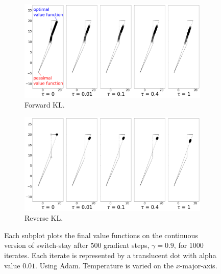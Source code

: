 \documentclass{article}
\begin{document}
\begin{figure}[ht]
  \centering
  \begin{subfigure}[b]{0.45\linewidth}
    \centering
    \includegraphics[width=\columnwidth]{figs/continuous-switch-stay/notlearnQ/cont_poly.png}
    \caption{Forward KL.}
    \label{fig:cont-switch-stay-forward}
  \end{subfigure}\hspace{15pt}%
  \begin{subfigure}[b]{0.45\linewidth}
        \centering
        \includegraphics[width=\columnwidth]{figs/continuous-switch-stay/notlearnQ/polytope_reverse_optim=adam_lr=0.005.png}
        \caption{Reverse KL.}
        \label{fig:cont-switch-stay-reverse}
  \end{subfigure}
  \caption{Each subplot plots the final value functions on the continuous version of switch-stay after 500 gradient steps, $\gamma = 0.9$, for 1000 iterates. Each iterate is represented by a translucent dot with alpha value $0.01$. Using Adam. Temperature is varied on the $x$-major-axis.}
\end{figure}


\end{document}
